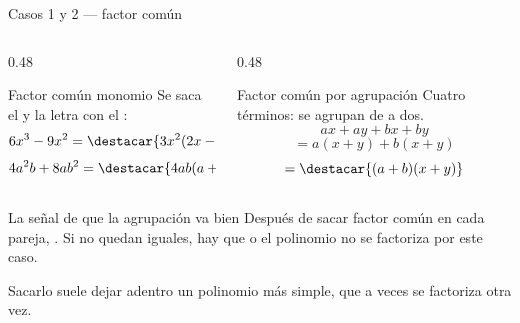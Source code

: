 \documentclass[aspectratio=169,10pt]{beamer}
\begin{document}

\begin{frame}{Casos 1 y 2 — factor común}
  \scriptsize
  \begin{columns}[T,onlytextwidth]
    \begin{column}{0.48\textwidth}
      \begin{block}{Factor común monomio}
        \tiny
        Se saca el  y la letra con el
        :
        \[ 6x^{3}-9x^{2} = \destacar{3x^{2}(2x-3)} \]
        \[ 4a^{2}b+8ab^{2} = \destacar{4ab(a+2b)} \]
      \end{block}
    \end{column}
    \begin{column}{0.48\textwidth}
      \begin{block}{Factor común por agrupación}
        \tiny
        Cuatro términos: se agrupan de a dos.
        \[ ax+ay+bx+by \]
        \[ = a(x+y) + b(x+y) \]
        \[ = \destacar{(a+b)(x+y)} \]
      \end{block}
    \end{column}
  \end{columns}

  \vspace{0.12cm}
  \begin{alertblock}{La señal de que la agrupación va bien}
    \scriptsize
    Después de sacar factor común en cada pareja, . Si no quedan iguales, hay que
     o el polinomio no se factoriza por este
    caso.
  \end{alertblock}

  \vspace{0.05cm}
  {\tiny\color{uniGris} 
  Sacarlo suele dejar adentro un polinomio más simple, que a veces se factoriza
  otra vez.}
\end{frame}
\end{document}
